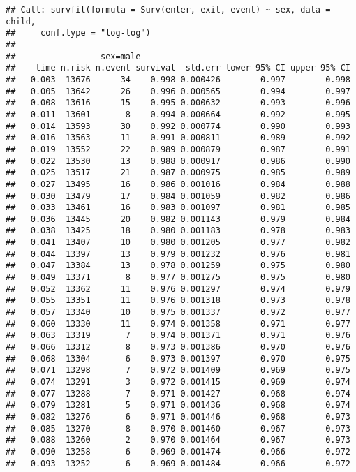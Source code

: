 \documentclass[
]{book}
\begin{document}
\begin{verbatim}
## Call: survfit(formula = Surv(enter, exit, event) ~ sex, data = child, 
##     conf.type = "log-log")
## 
##                 sex=male 
##    time n.risk n.event survival  std.err lower 95% CI upper 95% CI
##   0.003  13676      34    0.998 0.000426        0.997        0.998
##   0.005  13642      26    0.996 0.000565        0.994        0.997
##   0.008  13616      15    0.995 0.000632        0.993        0.996
##   0.011  13601       8    0.994 0.000664        0.992        0.995
##   0.014  13593      30    0.992 0.000774        0.990        0.993
##   0.016  13563      11    0.991 0.000811        0.989        0.992
##   0.019  13552      22    0.989 0.000879        0.987        0.991
##   0.022  13530      13    0.988 0.000917        0.986        0.990
##   0.025  13517      21    0.987 0.000975        0.985        0.989
##   0.027  13495      16    0.986 0.001016        0.984        0.988
##   0.030  13479      17    0.984 0.001059        0.982        0.986
##   0.033  13461      16    0.983 0.001097        0.981        0.985
##   0.036  13445      20    0.982 0.001143        0.979        0.984
##   0.038  13425      18    0.980 0.001183        0.978        0.983
##   0.041  13407      10    0.980 0.001205        0.977        0.982
##   0.044  13397      13    0.979 0.001232        0.976        0.981
##   0.047  13384      13    0.978 0.001259        0.975        0.980
##   0.049  13371       8    0.977 0.001275        0.975        0.980
##   0.052  13362      11    0.976 0.001297        0.974        0.979
##   0.055  13351      11    0.976 0.001318        0.973        0.978
##   0.057  13340      10    0.975 0.001337        0.972        0.977
##   0.060  13330      11    0.974 0.001358        0.971        0.977
##   0.063  13319       7    0.974 0.001371        0.971        0.976
##   0.066  13312       8    0.973 0.001386        0.970        0.976
##   0.068  13304       6    0.973 0.001397        0.970        0.975
##   0.071  13298       7    0.972 0.001409        0.969        0.975
##   0.074  13291       3    0.972 0.001415        0.969        0.974
##   0.077  13288       7    0.971 0.001427        0.968        0.974
##   0.079  13281       5    0.971 0.001436        0.968        0.974
##   0.082  13276       6    0.971 0.001446        0.968        0.973
##   0.085  13270       8    0.970 0.001460        0.967        0.973
##   0.088  13260       2    0.970 0.001464        0.967        0.973
##   0.090  13258       6    0.969 0.001474        0.966        0.972
##   0.093  13252       6    0.969 0.001484        0.966        0.972

\end{verbatim}
\end{document}
